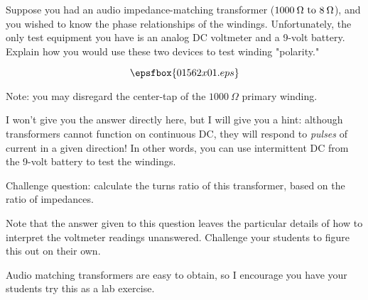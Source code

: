 

Suppose you had an audio impedance-matching transformer ($1000 \> \Omega \hbox{ to } 8 \> \Omega$), and you wished to know the phase relationships of the windings.  Unfortunately, the only test equipment you have is an analog DC voltmeter and a 9-volt battery.  Explain how you would use these two devices to test winding "polarity."

$$\epsfbox{01562x01.eps}$$

Note: you may disregard the center-tap of the $1000 \> \Omega$ primary winding.







I won't give you the answer directly here, but I will give you a hint: although transformers cannot function on continuous DC, they will respond to {\it pulses} of current in a given direction!  In other words, you can use intermittent DC from the 9-volt battery to test the windings.

\vskip 10pt

Challenge question: calculate the turns ratio of this transformer, based on the ratio of impedances.







Note that the answer given to this question leaves the particular details of how to interpret the voltmeter readings unanswered.  Challenge your students to figure this out on their own.

Audio matching transformers are easy to obtain, so I encourage you have your students try this as a lab exercise.




